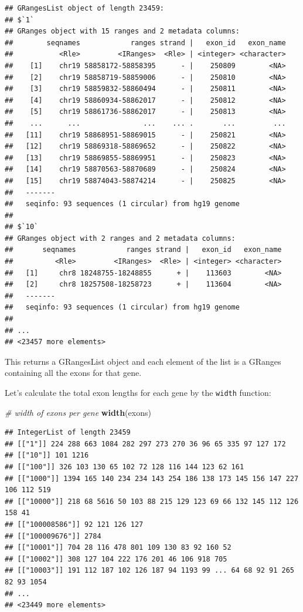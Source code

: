 \documentclass[
]{book}
\newenvironment{Shaded}{\begin{snugshade}}{\end{snugshade}}
\newcommand{\CommentTok}[1]{\textcolor[rgb]{0.56,0.35,0.01}{\textit{#1}}}
\newcommand{\FunctionTok}[1]{\textcolor[rgb]{0.13,0.29,0.53}{\textbf{#1}}}
\newcommand{\NormalTok}[1]{#1}
\begin{document}
\begin{verbatim}
## GRangesList object of length 23459:
## $`1`
## GRanges object with 15 ranges and 2 metadata columns:
##        seqnames            ranges strand |   exon_id   exon_name
##           <Rle>         <IRanges>  <Rle> | <integer> <character>
##    [1]    chr19 58858172-58858395      - |    250809        <NA>
##    [2]    chr19 58858719-58859006      - |    250810        <NA>
##    [3]    chr19 58859832-58860494      - |    250811        <NA>
##    [4]    chr19 58860934-58862017      - |    250812        <NA>
##    [5]    chr19 58861736-58862017      - |    250813        <NA>
##    ...      ...               ...    ... .       ...         ...
##   [11]    chr19 58868951-58869015      - |    250821        <NA>
##   [12]    chr19 58869318-58869652      - |    250822        <NA>
##   [13]    chr19 58869855-58869951      - |    250823        <NA>
##   [14]    chr19 58870563-58870689      - |    250824        <NA>
##   [15]    chr19 58874043-58874214      - |    250825        <NA>
##   -------
##   seqinfo: 93 sequences (1 circular) from hg19 genome
## 
## $`10`
## GRanges object with 2 ranges and 2 metadata columns:
##       seqnames            ranges strand |   exon_id   exon_name
##          <Rle>         <IRanges>  <Rle> | <integer> <character>
##   [1]     chr8 18248755-18248855      + |    113603        <NA>
##   [2]     chr8 18257508-18258723      + |    113604        <NA>
##   -------
##   seqinfo: 93 sequences (1 circular) from hg19 genome
## 
## ...
## <23457 more elements>
\end{verbatim}

This returns a GRangesList object and each element of the list is a GRanges containing all the exons for that gene.

Let's calculate the total exon lengths for each gene by the \texttt{width} function:

\begin{Shaded}
\begin{Highlighting}[]
\CommentTok{\# width of exons per gene}
\FunctionTok{width}\NormalTok{(exons)}
\end{Highlighting}
\end{Shaded}

\begin{verbatim}
## IntegerList of length 23459
## [["1"]] 224 288 663 1084 282 297 273 270 36 96 65 335 97 127 172
## [["10"]] 101 1216
## [["100"]] 326 103 130 65 102 72 128 116 144 123 62 161
## [["1000"]] 1394 165 140 234 234 143 254 186 138 173 145 156 147 227 106 112 519
## [["10000"]] 218 68 5616 50 103 88 215 129 123 69 66 132 145 112 126 158 41
## [["100008586"]] 92 121 126 127
## [["100009676"]] 2784
## [["10001"]] 704 28 116 478 801 109 130 83 92 160 52
## [["10002"]] 308 127 104 222 176 201 46 106 918 705
## [["10003"]] 191 112 187 102 126 187 94 1193 99 ... 64 68 92 91 265 82 93 1054
## ...
## <23449 more elements>
\end{verbatim}
\end{document}
